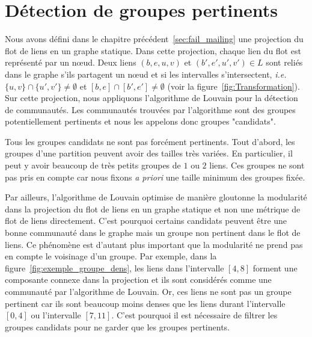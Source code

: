 \bigskip



\section{Détection de groupes pertinents}
\label{sec:groupe_dense_method}

Nous avons défini dans le chapitre précédent~\ref{sec:fail_mailing} une projection du flot de liens en un graphe statique.
Dans cette projection, chaque lien du flot est représenté par un n\oe{}ud.
Deux liens $(b,e,u,v)$ et $(b',e',u',v') \in L$ sont reliés dans le graphe s'ils partagent un n\oe{}ud et si les intervalles s'intersectent, \emph{i.e.} $\{u,v\} \cap \{u',v'\} \neq \emptyset$ et $[b,e]\cap[b',e'] \neq \emptyset$ (voir la figure~\ref{fig:Transformation}).
Sur cette projection, nous appliquons l'algorithme de Louvain pour la détection de communautés.
Les communautés trouvées par l'algorithme sont des groupes potentiellement pertinents et nous les appelons donc groupes "candidats".

Tous les groupes candidats ne sont pas forcément pertinents.
Tout d'abord, les groupes d'une partition peuvent avoir des tailles très variées.
En particulier, il peut y avoir beaucoup de très petits groupes de $1$ ou $2$ liens.
Ces groupes ne sont pas pris en compte car nous fixons \emph{a priori} une taille minimum des groupes fixée.

Par ailleurs, l'algorithme de Louvain optimise de manière gloutonne la modularité dans la projection du flot de liens en un graphe statique et non une métrique de flot de liens directement.
C'est pourquoi certains candidats peuvent être une bonne communauté dans le graphe mais un groupe non pertinent dans le flot de liens.
Ce phénomène est d'autant plus important que la modularité ne prend pas en compte le voisinage d'un groupe.
Par exemple, dans la figure~\ref{fig:exemple_groupe_dens}, les liens dans l'intervalle $[4,8]$ forment une composante connexe dans la projection et ils sont considérés comme une communauté par l'algorithme de Louvain.
Or, ces liens ne sont pas un groupe pertinent car ils sont beaucoup moins denses que les liens durant l'intervalle $[0,4]$ ou l'intervalle $[7,11]$.
C'est pourquoi il est nécessaire de filtrer les groupes candidats pour ne garder que les groupes pertinents.




